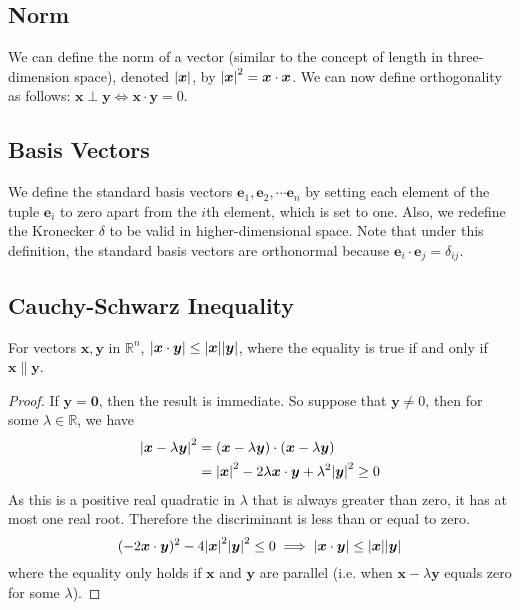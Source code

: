\documentclass{article}
\begin{document}
\subsection{Norm}
We can define the norm of a vector (similar to the concept of length in three-dimension space), denoted $\abs {\bm x}$, by $\abs{\bm x}^2 = \bm x \cdot \bm x$. We can now define orthogonality as follows: $\bm x \perp \bm y \iff \bm x \cdot \bm y = 0$.

\subsection{Basis Vectors}
We define the standard basis vectors $\bm e_1, \bm e_2, \cdots \bm e_n$ by setting each element of the tuple $\bm e_i$ to zero apart from the $i$th element, which is set to one. Also, we redefine the Kronecker $\delta$ to be valid in higher-dimensional space. Note that under this definition, the standard basis vectors are orthonormal because $\bm e_i \cdot \bm e_j = \delta_{ij}$.

\subsection{Cauchy-Schwarz Inequality}
\begin{proposition}
	For vectors $\bm x, \bm y$ in $\mathbb R^n$, $\abs{\bm x \cdot \bm y} \leq \abs{\bm x} \abs{\bm y}$, where the equality is true if and only if $\bm x \parallel \bm y$.
\end{proposition}
\begin{proof}
	If $\bm y = \bm 0$, then the result is immediate. So suppose that $\bm y \neq 0$, then for some $\lambda \in \mathbb R$, we have
	\begin{align*}
		\abs{\bm x - \lambda \bm y}^2 & =
		(\bm x - \lambda \bm y) \cdot (\bm x - \lambda \bm y)                                                          \\
		                              & = \abs{\bm x}^2 - 2 \lambda \bm x \cdot \bm y + \lambda^2 \abs{\bm y}^2 \geq 0
	\end{align*}
	As this is a positive real quadratic in $\lambda$ that is always greater than zero, it has at most one real root. Therefore the discriminant is less than or equal to zero.
	\[ (-2 \bm x \cdot \bm y)^2 - 4 \abs{\bm x}^2\abs{\bm y}^2 \leq 0
		\implies \abs{\bm x \cdot \bm y} \leq \abs{\bm x}\abs{\bm y} \]
	where the equality only holds if $\bm x$ and $\bm y$ are parallel (i.e. when $\bm x - \lambda \bm y$ equals zero for some $\lambda$).
\end{proof}
\end{document}
